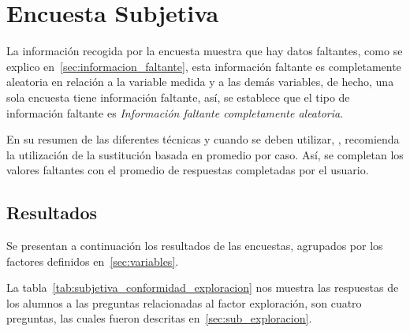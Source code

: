 \section{Encuesta Subjetiva}
\label{sec:res_subjetiva}


La información recogida por la encuesta muestra que hay datos faltantes, como se
explico en~\ref{sec:informacion_faltante}, esta información faltante es
completamente aleatoria en relación a la variable medida y a las demás
variables, de hecho, una sola encuesta tiene información faltante, así, se
establece que el tipo de información faltante es \emph{Información faltante
    completamente aleatoria}.

En su resumen de las diferentes técnicas y cuando se deben utilizar,
\cite{tsikriktsis2005review}, recomienda la utilización de la sustitución basada
en promedio por caso. Así, se completan los valores faltantes con el promedio de
respuestas completadas por el usuario.

\subsection{Resultados}

Se presentan a continuación los resultados de las encuestas, agrupados por los
factores definidos en~\ref{sec:variables}.

La tabla~\ref{tab:subjetiva_conformidad_exploracion} nos muestra las respuestas
de los alumnos a las preguntas relacionadas al factor exploración, son cuatro
preguntas, las cuales fueron descritas en~\ref{sec:sub_exploracion}. 

